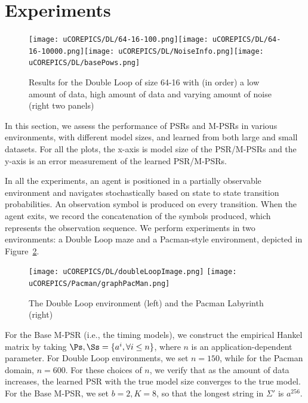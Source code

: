 \section{Experiments}\label{sec:exp}


\begin{figure}[ht!]
\centering
\texttt{[image: uCOREPICS/DL/64-16-100.png]}\texttt{[image: uCOREPICS/DL/64-16-10000.png]}\texttt{[image: uCOREPICS/DL/NoiseInfo.png]}\texttt{[image: uCOREPICS/DL/basePows.png]}\vspace*{-4mm}
\caption{Results for the Double Loop of size 64-16 with (in order) a low amount of data, high amount of data and varying amount of noise (right two panels)\label{fig-double}\vspace*{-4mm}}
\end{figure}


In this section, we assess the performance of PSRs and M-PSRs in various environments, with different model sizes, and learned from both large and small datasets. For all the plots, the x-axis is model size of the PSR/M-PSRs and the y-axis is an error measurement of the learned PSR/M-PSRs.

In all the experiments, an agent is positioned in  a partially observable environment and navigates  stochastically based on state to state transition probabilities. An observation symbol is produced on every transition. When the agent exits, we record the concatenation of the symbols produced, which represents the observation sequence.  We perform experiments in two environments: a Double Loop maze and a Pacman-style environment, depicted in Figure~\ref{overflow}.

\begin{figure}[ht!]
\centering
\texttt{[image: uCOREPICS/DL/doubleLoopImage.png]}
%
\texttt{[image: uCOREPICS/Pacman/graphPacMan.png]}\vspace*{-4mm}
\caption{The Double Loop environment (left) and the Pacman Labyrinth (right)\label{overflow}\vspace*{-4mm}}
\end{figure}


For the Base M-PSR (i.e., the timing models), we construct the empirical Hankel matrix by taking $\Ps, \Ss = \{a^i, \forall i \leq n\}$, where $n$ is an application-dependent parameter. For Double Loop environments, we set $n = 150$, while for the Pacman domain, $n = 600$. For these choices of $n$, we verify that as the amount of data increases, the learned PSR with the true model size converges to the true model. For the Base M-PSR, we set $b=2, K=8$, so that the longest string in $\Sigma'$ is $a^{256}$.

